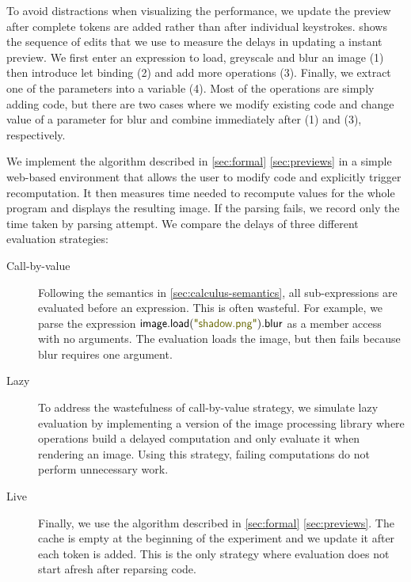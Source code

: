 \documentclass[english,crc,references=cleveref]{programming}
\theoremstyle{plain}
\theoremstyle{definition}
\newcommand{\str}[1]{\textnormal{\textcolor{strclr}{\sffamily "#1"}}}
\newcommand{\ident}[1]{\textnormal{\textcolor{idclr}{\sffamily #1}}}
\begin{document}

To avoid distractions when visualizing the performance, we update the preview after complete tokens are
added rather than after individual keystrokes.
 shows the sequence of edits that we use to measure
the delays in updating a instant preview. We first enter an expression to load, greyscale and blur
an image (1) then introduce let binding (2) and add more operations (3). Finally, we extract
one of the parameters into a variable (4). Most of the operations are simply adding code, but
there are two cases where we modify existing code and change value of a parameter for \ident{blur}
and \ident{combine} immediately after (1) and (3), respectively.

We implement the algorithm described in \cref{sec:formal} \cref{sec:previews} in a
simple web-based environment that allows the user to modify code and explicitly trigger
recomputation. It then measures time needed to recompute values for the whole program and
displays the resulting image. If the parsing fails, we record only the time taken by parsing attempt. We compare the
delays of three different evaluation strategies:

\begin{description}
\item[Call-by-value] Following the semantics in \cref{sec:calculus-semantics},
  all sub-expressions are evaluated before an expression. This is often wasteful. For example,
  we parse the expression $\ident{image}.\ident{load}(\str{shadow.png}).\ident{blur}$ as a member access with no
  arguments. The evaluation loads the image, but then fails because blur requires one argument.

\item[Lazy] To address the wastefulness of call-by-value strategy, we
  simulate lazy evaluation by implementing a version of the image processing library where
  operations build a delayed computation and only evaluate it when rendering an image. Using
  this strategy, failing computations do not perform unnecessary work.

\item[Live] Finally, we use the algorithm described in
  \cref{sec:formal} \cref{sec:previews}. The cache is empty at the beginning of the
  experiment and we update it after each token is added. This is the only strategy where
  evaluation does not start afresh after reparsing code.
\end{description}
\end{document}
